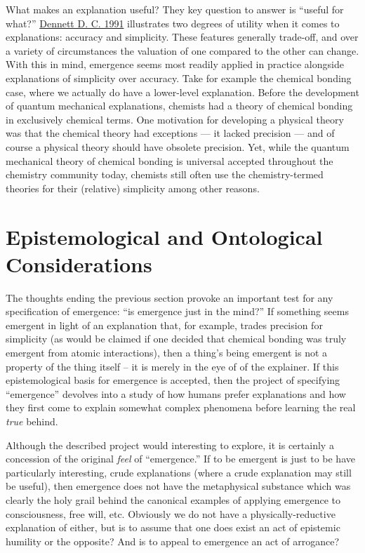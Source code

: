 \documentclass{article}
\newcommand{\ti}[1]{\textit{#1}}
\renewcommand{\cite}[1]{\hyperlink{#1}{#1}}
\begin{document}
What makes an explanation useful? They key question to answer is ``useful for what?'' \cite{Dennett D. C. 1991} illustrates two degrees of utility when it comes to explanations: accuracy and simplicity. These features generally trade-off, and over a variety of circumstances the valuation of one compared to the other can change. With this in mind, emergence seems most readily applied in practice alongside explanations of simplicity over accuracy. Take for example the chemical bonding case, where we actually do have a lower-level explanation. Before the development of quantum mechanical explanations, chemists had a theory of chemical bonding in exclusively chemical terms. One motivation for developing a physical theory was that the chemical theory had exceptions --- it lacked precision --- and of course a physical theory should have obsolete precision. Yet, while the quantum mechanical theory of chemical bonding is universal accepted throughout the chemistry community today, chemists still often use the chemistry-termed theories for their (relative) simplicity among other reasons.

\section{Epistemological and Ontological Considerations}


The thoughts ending the previous section provoke an important test for any specification of emergence: ``is emergence just in the mind?'' If something seems emergent in light of an explanation that, for example, trades precision for simplicity (as would be claimed if one decided that chemical bonding was truly emergent from atomic interactions), then a thing's being emergent is not a property of the thing itself -- it is merely in the eye of of the explainer. If this epistemological basis for emergence is accepted, then the project of specifying ``emergence'' devolves into a study of how humans prefer explanations and how they first come to explain somewhat complex phenomena before learning the real \ti{true} behind.


Although the described project would interesting to explore, it is certainly a concession of the original \ti{feel} of ``emergence.'' If to be emergent is just to be have particularly interesting, crude explanations (where a crude explanation may still be useful), then emergence does not have the metaphysical substance which was clearly the holy grail behind the canonical examples of applying emergence to consciousness, free will, etc. Obviously we do not have a physically-reductive explanation of either, but is to assume that one does exist an act of epistemic humility or the opposite? And is to appeal to emergence an act of arrogance?
\end{document}
